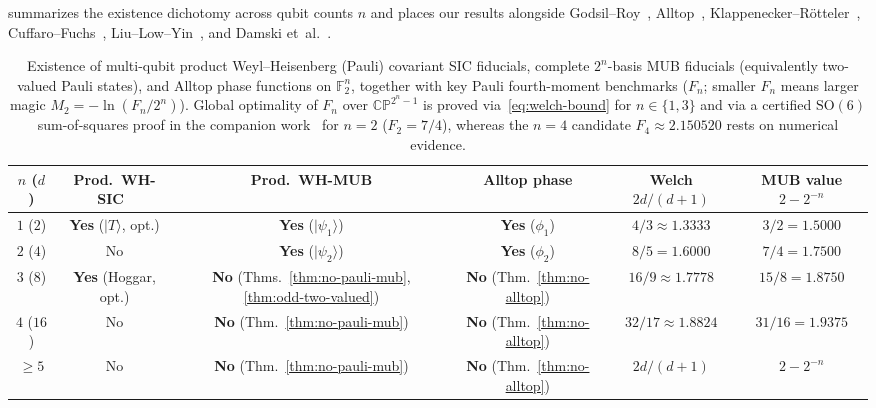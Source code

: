 \documentclass[11pt,a4paper]{article}
\theoremstyle{plain}
\theoremstyle{definition}
\theoremstyle{remark}
\newcommand{\F}{\mathbb{F}}
\newcommand{\CP}{\mathbb{CP}}
\newcommand{\ket}[1]{|#1\rangle}
\numberwithin{equation}{section}
\begin{document}
 summarizes the existence dichotomy across qubit counts $n$ and places our results alongside Godsil--Roy~\cite{godsil2009equiangular}, Alltop~\cite{alltop1980complex}, Klappenecker--R\"otteler~\cite{klappenecker2004constructions}, Cuffaro--Fuchs~\cite{cuffaro2024quantum}, Liu--Low--Yin~\cite{liu2026maximal}, and Damski et~al.~\cite{damski2026product}.

\begin{table}[htbp]
\centering
\caption{Existence of multi-qubit product Weyl--Heisenberg (Pauli) covariant SIC fiducials, complete $2^n$-basis MUB fiducials (equivalently two-valued Pauli states), and Alltop phase functions on $\F_2^n$, together with key Pauli fourth-moment benchmarks ($F_n$; smaller $F_n$ means larger magic $M_2 = -\ln(F_n/2^n)$). Global optimality of $F_n$ over $\CP^{2^n-1}$ is proved via~\eqref{eq:welch-bound} for $n \in \{1, 3\}$ and via a certified $\mathrm{SO}(6)$ sum-of-squares proof in the companion work~\cite{ye2026twoqubit} for $n = 2$ ($F_2 = 7/4$), whereas the $n = 4$ candidate $F_4 \approx 2.150520$ rests on numerical evidence.}\label{tab:positioning}
\smallskip
\footnotesize
\setlength{\tabcolsep}{3.0pt}
\renewcommand{\arraystretch}{1.18}
\begin{tabular}{@{}cccccc@{}}
\toprule
$n$ ($d$) & Prod.\ WH-SIC~\cite{godsil2009equiangular} & Prod.\ WH-MUB & Alltop phase & Welch $2d/(d+1)$ & MUB value $2-2^{-n}$ \\
\midrule
$1$ ($2$)  & \textbf{Yes} ($\ket{T}$, opt.) & \textbf{Yes} ($\ket{\psi_1}$) & \textbf{Yes} ($\phi_1$) & $4/3 \approx 1.3333$ & $3/2 = 1.5000$ \\
$2$ ($4$)  & No                        & \textbf{Yes} ($\ket{\psi_2}$) & \textbf{Yes} ($\phi_2$) & $8/5 = 1.6000$       & $7/4 = 1.7500$ \\
$3$ ($8$)  & \textbf{Yes} (Hoggar, opt.) & \textbf{No} (Thms.~\ref{thm:no-pauli-mub}, \ref{thm:odd-two-valued}) & \textbf{No} (Thm.~\ref{thm:no-alltop}) & $16/9 \approx 1.7778$ & $15/8 = 1.8750$ \\
$4$ ($16$) & No                        & \textbf{No} (Thm.~\ref{thm:no-pauli-mub}) & \textbf{No} (Thm.~\ref{thm:no-alltop}) & $32/17 \approx 1.8824$ & $31/16 = 1.9375$ \\
$\ge 5$    & No                        & \textbf{No} (Thm.~\ref{thm:no-pauli-mub}) & \textbf{No} (Thm.~\ref{thm:no-alltop}) & $2d/(d+1)$ & $2 - 2^{-n}$ \\
\bottomrule
\end{tabular}
\end{table}
\end{document}
